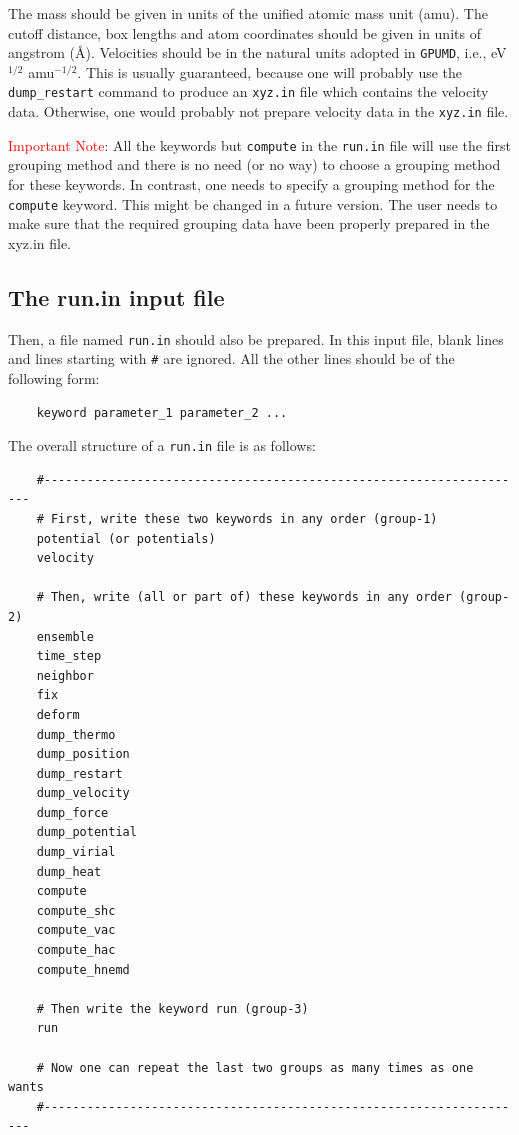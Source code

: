 \documentclass[12pt,a4paper]{report}
\begin{document}
The mass should be given in units of the unified atomic mass unit (amu). The cutoff distance, box lengths and atom coordinates should be given in units of angstrom (\AA). Velocities should be in the natural units adopted in \verb"GPUMD", i.e., eV$^{1/2}$ amu$^{-1/2}$. This is usually guaranteed, because one will probably use the \verb"dump_restart" command to produce an \verb"xyz.in" file which contains the velocity data. Otherwise, one would probably not prepare velocity data in the \verb"xyz.in" file.

\textcolor{red}{Important Note}: All the keywords but \verb"compute" in the \verb"run.in" file will use the first grouping method and there is no need (or no way) to choose a grouping method for these keywords. In contrast, one needs to specify a grouping method for the \verb"compute" keyword. This might be changed in a future version. The user needs to make sure that the required grouping data have been properly prepared in the xyz.in file.

\subsection{The run.in input file}

Then, a file named \verb"run.in" should also be prepared. In this input file, blank lines and lines starting with \verb"#" are ignored. All the other lines should be of the following form:
\begin{verbatim}
    keyword parameter_1 parameter_2 ...
\end{verbatim}
The overall structure of a \verb"run.in" file is as follows:
\begin{verbatim}
    #--------------------------------------------------------------------
    # First, write these two keywords in any order (group-1)
    potential (or potentials)
    velocity

    # Then, write (all or part of) these keywords in any order (group-2)
    ensemble
    time_step
    neighbor
    fix
    deform
    dump_thermo
    dump_position
    dump_restart
    dump_velocity
    dump_force
    dump_potential
    dump_virial
    dump_heat
    compute
    compute_shc
    compute_vac
    compute_hac
    compute_hnemd

    # Then write the keyword run (group-3)
    run

    # Now one can repeat the last two groups as many times as one wants
    #--------------------------------------------------------------------
\end{verbatim}
\end{document}
